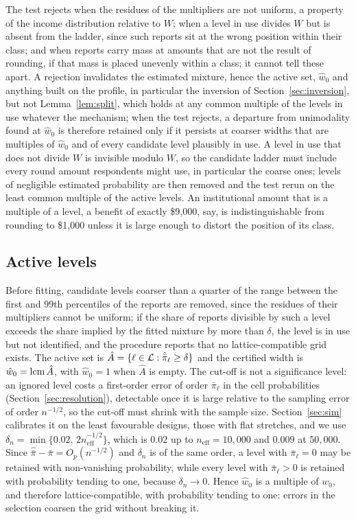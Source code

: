 The test rejects when the residues of the multipliers are not uniform, a property of the income distribution relative to $W$; when a level in use divides $W$ but is absent from the ladder, since such reports sit at the wrong position within their class; and when reports carry mass at amounts that are not the result of rounding, if that mass is placed unevenly within a class; it cannot tell these apart. A rejection invalidates the estimated mixture, hence the active set, $\hat w_0$ and anything built on the profile, in particular the inversion of Section~\ref{sec:inversion}, but not Lemma~\ref{lem:split}, which holds at any common multiple of the levels in use whatever the mechanism; when the test rejects, a departure from unimodality found at $\hat w_0$ is therefore retained only if it persists at coarser widths that are multiples of $\hat w_0$ and of every candidate level plausibly in use. A level in use that does not divide $W$ is invisible modulo $W$, so the candidate ladder must include every round amount respondents might use, in particular the coarse ones; levels of negligible estimated probability are then removed and the test rerun on the least common multiple of the active levels. An institutional amount that is a multiple of a level, a benefit of exactly \$9{,}000, say, is indistinguishable from rounding to \$1{,}000 unless it is large enough to distort the position of its class.

\subsection{Active levels}

Before fitting, candidate levels coarser than a quarter of the range between the first and 99th percentiles of the reports are removed, since the residues of their multipliers cannot be uniform; if the share of reports divisible by such a level exceeds the share implied by the fitted mixture by more than $\delta$, the level is in use but not identified, and the procedure reports that no lattice-compatible grid exists. The active set is $\hat A=\{\ell\in\mathcal{L}:\hat{\bar\pi}_\ell\ge\delta\}$ and the certified width is $\hat w_0=\operatorname{lcm}\hat A$, with $\hat w_0=1$ when $\hat A$ is empty. The cut-off is not a significance level: an ignored level costs a first-order error of order $\bar\pi_\ell$ in the cell probabilities (Section~\ref{sec:resolution}), detectable once it is large relative to the sampling error of order $n^{-1/2}$, so the cut-off must shrink with the sample size. Section~\ref{sec:sim} calibrates it on the least favourable designs, those with flat stretches, and we use $\delta_n=\min\{0.02,\,2n_{\mathrm{eff}}^{-1/2}\}$, which is $0.02$ up to $n_{\mathrm{eff}}=10{,}000$ and $0.009$ at $50{,}000$. Since $\hat{\bar\pi}-\bar\pi=O_p(n^{-1/2})$ and $\delta_n$ is of the same order, a level with $\bar\pi_\ell=0$ may be retained with non-vanishing probability, while every level with $\bar\pi_\ell>0$ is retained with probability tending to one, because $\delta_n\to0$. Hence $\hat w_0$ is a multiple of $w_0$, and therefore lattice-compatible, with probability tending to one: errors in the selection coarsen the grid without breaking it.
